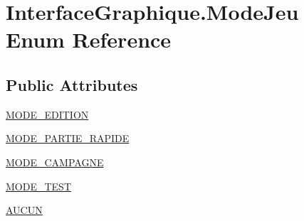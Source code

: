 \hypertarget{enum_interface_graphique_1_1_mode_jeu}{\section{Interface\-Graphique.\-Mode\-Jeu Enum Reference}
\label{enum_interface_graphique_1_1_mode_jeu}
}
\subsection*{Public Attributes}
\begin{DoxyCompactItemize}
\item 
\hyperlink{enum_interface_graphique_1_1_mode_jeu_a2ce3fc855d657e5ed1cb9a1ba39322d1}{M\-O\-D\-E\-\_\-\-E\-D\-I\-T\-I\-O\-N}
\item 
\hyperlink{enum_interface_graphique_1_1_mode_jeu_aa18a0fa455af8be0edef086145d26a43}{M\-O\-D\-E\-\_\-\-P\-A\-R\-T\-I\-E\-\_\-\-R\-A\-P\-I\-D\-E}
\item 
\hyperlink{enum_interface_graphique_1_1_mode_jeu_af6363b742c940c0eee0d7a07f92ff6c2}{M\-O\-D\-E\-\_\-\-C\-A\-M\-P\-A\-G\-N\-E}
\item 
\hyperlink{enum_interface_graphique_1_1_mode_jeu_a9d195d987725b39d401c0af0e650b7f1}{M\-O\-D\-E\-\_\-\-T\-E\-S\-T}
\item 
\hyperlink{enum_interface_graphique_1_1_mode_jeu_a58aa4831d87829eb51c57d16dfb2c451}{A\-U\-C\-U\-N}
\end{DoxyCompactItemize}


